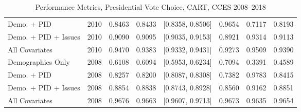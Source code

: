 \begin{table}[ht]
\begin{tabular}{lrrrlrrr}
  Demo. + PID & 2010 & 0.8463 & 0.8433 & [0.8358, 0.8506] & 0.9654 & 0.7117 & 0.8193 \\ 
  Demo. + PID + Issues & 2010 & 0.9090 & 0.9095 & [0.9035, 0.9153] & 0.8921 & 0.9314 & 0.9113 \\ 
  All Covariates & 2010 & 0.9470 & 0.9383 & [0.9332, 0.9431] & 0.9273 & 0.9509 & 0.9390 \\ 
  Demographics Only & 2008 & 0.6108 & 0.6094 & [0.5953, 0.6234] & 0.7094 & 0.3391 & 0.4589 \\ 
  Demo. + PID & 2008 & 0.8257 & 0.8200 & [0.8087, 0.8308] & 0.7382 & 0.9783 & 0.8415 \\ 
  Demo. + PID + Issues & 2008 & 0.8854 & 0.8838 & [0.8743, 0.8928] & 0.8560 & 0.9162 & 0.8851 \\ 
  All Covariates & 2008 & 0.9676 & 0.9663 & [0.9607, 0.9713] & 0.9673 & 0.9635 & 0.9654 \\ 
   \bottomrule
\end{tabular}
\caption{Performance Metrics, Presidential Vote Choice, CART, CCES 2008--2018} 
\label{tab:cces_preschoice_cart}
\end{table}
